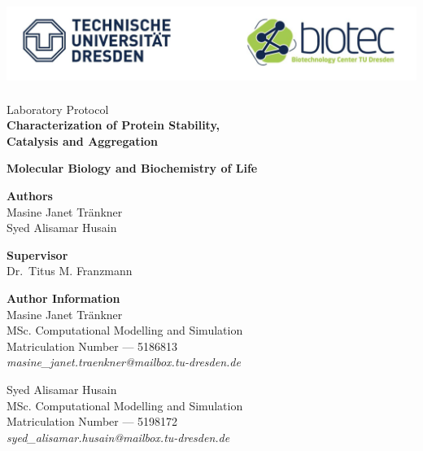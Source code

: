 \documentclass[a4paper,10pt]{article}
\begin{document}
    \begin{titlepage}
        \begin{center}
            \includegraphics[height=7.5em]{../resources/unilogo.png}
            \vspace{10em}
            
            {\LARGE Laboratory Protocol} \\ 
            {\huge\bfseries Characterization of Protein Stability,\\ Catalysis and Aggregation}
            \vspace{3em}
            
            {\large\bfseries Molecular Biology and Biochemistry of Life}\\
            \vspace{12em}

            {\bfseries Authors} \\ 
            Masine Janet Tränkner\\
            Syed Alisamar Husain
            \vspace{5em}

            {\bfseries Supervisor} \\ Dr.\ Titus M. Franzmann
        \end{center}
    \end{titlepage}
    \pagebreak

    \tableofcontents
    \listoffigures
    \vspace{3em}
    {\noindent\Large\bfseries Author Information \vspace{0.75em}}\\
    \noindent\large Masine Janet Tränkner\\
    {\small MSc. Computational Modelling and Simulation}\\
    {\small Matriculation Number --- 5186813}\\
    {\it\small masine\_janet.traenkner@mailbox.tu-dresden.de}\\\vspace{0.5em}
    
    \noindent\large Syed Alisamar Husain\\
    {\small MSc. Computational Modelling and Simulation}\\
    {\small Matriculation Number --- 5198172}\\
    {\it\small syed\_alisamar.husain@mailbox.tu-dresden.de}
    \pagebreak
\end{document}
